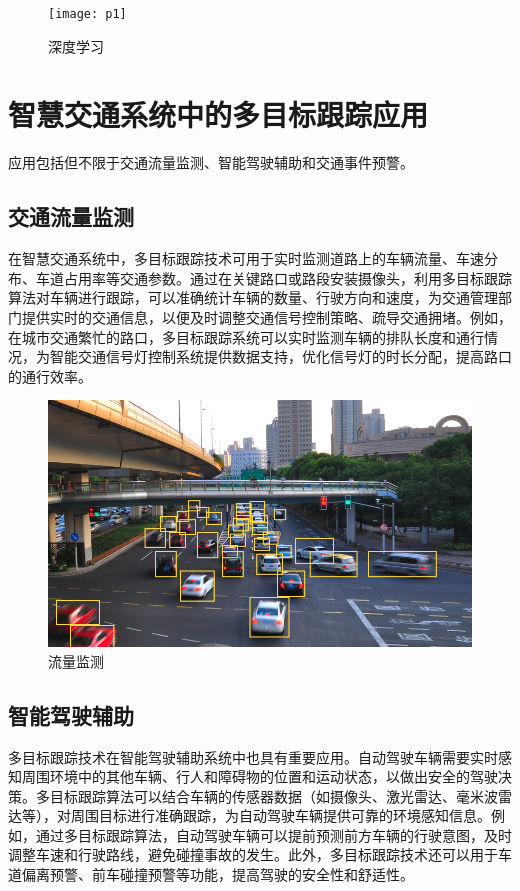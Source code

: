 \begin{figure}[htbp] %
	\centering
	\texttt{[image: p1]} %
	\caption{深度学习} %
	\label{fig:p1} %
\end{figure}

\section{智慧交通系统中的多目标跟踪应用}

应用包括但不限于交通流量监测、智能驾驶辅助和交通事件预警。

\subsection{交通流量监测}
在智慧交通系统中，多目标跟踪技术可用于实时监测道路上的车辆流量、车速分布、车道占用率等交通参数。通过在关键路口或路段安装摄像头，利用多目标跟踪算法对车辆进行跟踪，可以准确统计车辆的数量、行驶方向和速度，为交通管理部门提供实时的交通信息，以便及时调整交通信号控制策略、疏导交通拥堵。例如，在城市交通繁忙的路口，多目标跟踪系统可以实时监测车辆的排队长度和通行情况，为智能交通信号灯控制系统提供数据支持，优化信号灯的时长分配，提高路口的通行效率\cite{付裕 2023 单源摄像头下的行人多目标跟踪研究}。


\begin{figure}[htbp] %
	\centering
	\includegraphics[width=1\textwidth]{p2} %
	\caption{流量监测} %
	\label{fig:p2} %
\end{figure}


\subsection{智能驾驶辅助}
多目标跟踪技术在智能驾驶辅助系统中也具有重要应用。自动驾驶车辆需要实时感知周围环境中的其他车辆、行人和障碍物的位置和运动状态，以做出安全的驾驶决策。多目标跟踪算法可以结合车辆的传感器数据（如摄像头、激光雷达、毫米波雷达等），对周围目标进行准确跟踪，为自动驾驶车辆提供可靠的环境感知信息。例如，通过多目标跟踪算法，自动驾驶车辆可以提前预测前方车辆的行驶意图，及时调整车速和行驶路线，避免碰撞事故的发生。此外，多目标跟踪技术还可以用于车道偏离预警、前车碰撞预警等功能，提高驾驶的安全性和舒适性\cite{王宇唯 2023 基于CARLA的仿真数据集生成框架研究}。



